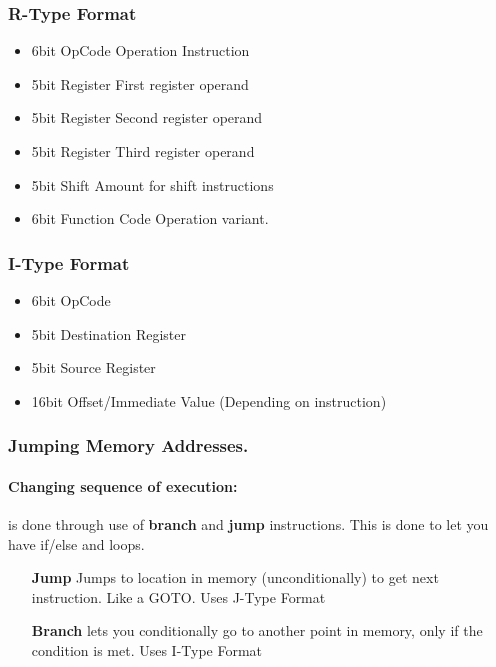 \documentclass{article}
\newcommand\tab[1][0.5cm]{\hspace*{#1}}
\begin{document}
		\subsubsection{R-Type Format}
			\begin{itemize}
				\item 6bit OpCode \tab \tab \tab Operation Instruction
				\item 5bit Register \tab \tab \tab First register operand
				\item 5bit Register \tab \tab \tab Second register operand
				\item 5bit Register \tab \tab \tab Third register operand
				\item 5bit Shift \tab \tab \tab \tab Amount for shift instructions
				\item 6bit Function Code \tab Operation variant.
			\end{itemize}


		\subsubsection{I-Type Format}
			\begin{itemize}
				\item 6bit OpCode
				\item 5bit Destination Register
				\item 5bit Source Register
				\item 16bit Offset/Immediate Value (Depending on instruction)
			\end{itemize}

		\subsubsection{Jumping Memory Addresses.}
			\paragraph{Changing sequence of execution: } is done through use of \textbf{branch} and \textbf{jump} instructions. This is done to let you have if/else and loops.
			\begin{enumerate}
				\item[\textbf{Jump}] Jumps to location in memory (unconditionally) to get next instruction. Like a GOTO. Uses J-Type Format
				\item[\textbf{Branch}] lets you conditionally go to another point in memory, only if the condition is met. Uses I-Type Format
			\end{enumerate}
\end{document}
